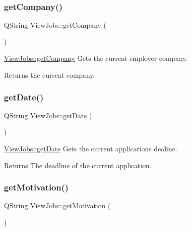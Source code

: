\subsubsection{\texorpdfstring{get\+Company()}{getCompany()}}
{\footnotesize\ttfamily Q\+String View\+Jobs\+::get\+Company (\begin{DoxyParamCaption}{ }\end{DoxyParamCaption})}



\mbox{\hyperlink{class_view_jobs_a88d7c0a7a79bc7a7e02b524587983bf8}{View\+Jobs\+::get\+Company}} Gets the current employer company. 

\begin{DoxyReturn}{Returns}
the current company. 
\end{DoxyReturn}
\mbox{\label{class_view_jobs_af046f9201cc6031e070b4f9b613a35f9}} 
\subsubsection{\texorpdfstring{get\+Date()}{getDate()}}
{\footnotesize\ttfamily Q\+String View\+Jobs\+::get\+Date (\begin{DoxyParamCaption}{ }\end{DoxyParamCaption})}



\mbox{\hyperlink{class_view_jobs_af046f9201cc6031e070b4f9b613a35f9}{View\+Jobs\+::get\+Date}} Gets the current application\textquotesingle{}s dealine. 

\begin{DoxyReturn}{Returns}
The deadline of the current application. 
\end{DoxyReturn}
\mbox{\label{class_view_jobs_a238ec5365ef2c39baa97670769dfedca}} 
\subsubsection{\texorpdfstring{get\+Motivation()}{getMotivation()}}
{\footnotesize\ttfamily Q\+String View\+Jobs\+::get\+Motivation (\begin{DoxyParamCaption}{ }\end{DoxyParamCaption})}



